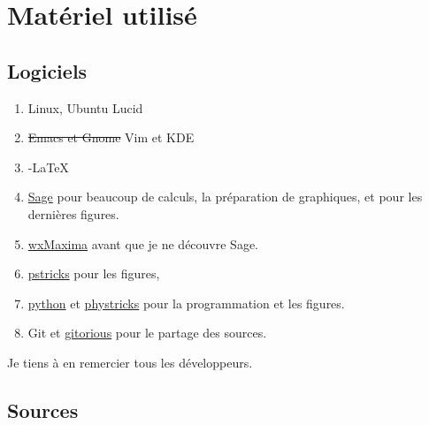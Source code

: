 
\section{Matériel utilisé}

\subsection{Logiciels}

\begin{enumerate}
	\item
		Linux, Ubuntu Lucid
	\item
		\st{Emacs et Gnome} Vim et KDE	%
	\item
		\AmS-\LaTeX
	\item
		\href{www.sagemath.org}{Sage} pour beaucoup de calculs, la préparation de graphiques, et pour les dernières figures.
	\item 
		\href{http://maxima.sourceforge.net/}{wxMaxima} avant que je ne découvre Sage.
	\item 
		\href{http://fr.wikipedia.org/wiki/PSTricks}{pstricks} pour les figures,
	\item
		\href{http://fr.wikipedia.org/wiki/Python_(langage)}{python} et \href{http://student.ulb.ac.be/~lclaesse/phystricks-doc.pdf}{phystricks} pour la programmation et les figures.
	\item
		Git et \href{www.gitorious.org}{gitorious} pour le partage des sources.
\end{enumerate}
Je tiens à en remercier tous les développeurs.
		
\subsection{Sources}

